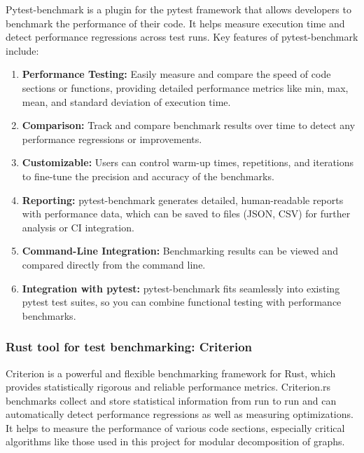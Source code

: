 Pytest-benchmark\cite{pytestbenchmark} is a plugin for the pytest framework that allows developers to benchmark the performance of their code.
It helps measure execution time and detect performance regressions across test runs.
Key features of pytest-benchmark include:
\begin{enumerate}
    \item \textbf{Performance Testing:} Easily measure and compare the speed of code sections or functions, providing detailed performance metrics like min, max, mean, and standard deviation of execution time.
    \item \textbf{Comparison:} Track and compare benchmark results over time to detect any performance regressions or improvements.
    \item \textbf{Customizable:} Users can control warm-up times, repetitions, and iterations to fine-tune the precision and accuracy of the benchmarks.
    \item \textbf{Reporting:} pytest-benchmark generates detailed, human-readable reports with performance data, which can be saved to files (JSON, CSV) for further analysis or CI integration.
    \item \textbf{Command-Line Integration:} Benchmarking results can be viewed and compared directly from the command line.
    \item \textbf{Integration with pytest:} pytest-benchmark fits seamlessly into existing pytest test suites, so you can combine functional testing with performance benchmarks.
\end{enumerate}


\subsubsection{Rust tool for test benchmarking: Criterion}

Criterion\cite{criterion} is a powerful and flexible benchmarking framework for Rust, which provides statistically rigorous and reliable performance metrics.
Criterion.rs benchmarks collect and store statistical information from run to run and can automatically detect performance regressions as well as measuring optimizations.
It helps to measure the performance of various code sections, especially critical algorithms like those used in this project for modular decomposition of graphs.

